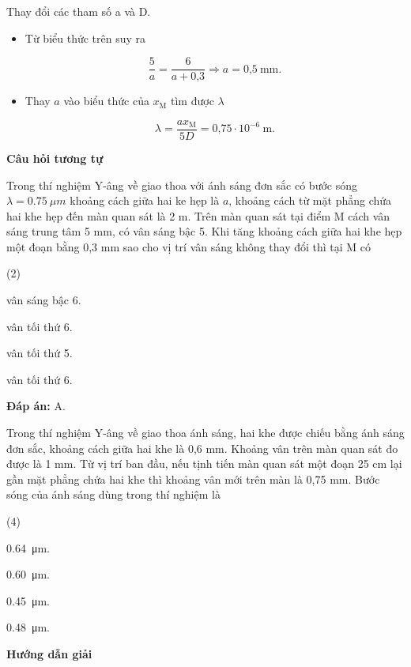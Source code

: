 \begin{dang}{Thay đổi các tham số a và D.}
{\begin{itemize}
			\begin{equation*}
				x_{\text{M}}=5 \dfrac{\lambda D}{a}= 6 \dfrac{\lambda D}{a+ \text{0,3}}.
			\end{equation*}
			\item Từ biểu thức trên suy ra 
			
			\begin{equation*}
				\dfrac{5}{a}=  \dfrac{6}{a+ \text{0,3}}\Rightarrow a = \text{0,5}\ \text{mm}.
			\end{equation*}
			
			\item Thay $a$ vào biểu thức của $x_{\text{M}}$ tìm được $\lambda$
			
			\begin{equation*}
				\lambda = \dfrac{a x_{\text{M}}}{5D}= \text{0,75} \cdot 10^{-6}\ \text{m}.
			\end{equation*}
		\end{itemize}
		
		\begin{center}
			\textbf{Câu hỏi tương tự}
		\end{center}
		
		Trong  thí nghiệm Y-âng về giao thoa với ánh sáng đơn sắc có bước sóng $\lambda = \SI{0,75}{\mu m}$  khoảng cách giữa hai ke hẹp là $a$, khoảng cách từ mặt phẳng chứa hai khe hẹp đến màn quan sát là 2 m. Trên màn quan sát tại điểm M cách vân sáng trung tâm 5 mm, có vân sáng bậc 5. Khi tăng khoảng cách giữa hai khe hẹp một đoạn bằng 0,3 mm sao cho vị trí vân sáng không thay đổi thì tại M có 
		\begin{mcq}(2)
			\item vân sáng bậc 6.		
			\item vân tối thứ 6.		
			\item vân tối thứ 5.		
			\item vân tối thứ 6.	
		\end{mcq}
		
		\textbf{Đáp án:} A.
	}
	{Trong thí nghiệm Y-âng về giao thoa ánh sáng, hai khe được chiếu bằng ánh sáng đơn sắc, khoảng cách giữa hai khe là 0,6 mm. Khoảng vân trên màn quan sát đo được là 1 mm. Từ vị trí ban đầu, nếu tịnh tiến màn quan sát một đoạn 25 cm lại gần mặt phẳng chứa hai khe thì khoảng vân mới trên màn là 0,75 mm. Bước sóng của ánh sáng dùng trong thí nghiệm là 
		\begin{mcq}(4)
			\item  \SI{0,64}{\micro\meter}.		
			\item  \SI{0,60}{\micro\meter}.		
			\item  \SI{0,45}{\micro\meter}.		
			\item  \SI{0,48}{\micro\meter}.
		\end{mcq}
	}
	{\begin{center}
			\textbf{Hướng dẫn giải}
		\end{center}
		
}
\end{dang}
